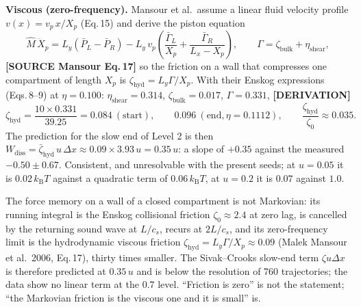 \documentclass[11pt,a4paper]{article}
\newcommand{\kT}{k_{\mathrm B}T}
\newcommand{\src}[1]{\textcolor{OliveGreen}{\textbf{[SOURCE #1]}}}
\newcommand{\der}{\textcolor{NavyBlue}{\textbf{[DERIVATION]}}}
\begin{document}
\textbf{Viscous (zero-frequency).} Mansour et al.\ assume a linear fluid velocity profile $v(x) = v_p\,x/X_p$ (Eq.\,15) and derive the piston equation
\begin{equation}
\hat M\,\ddot X_p = L_y(\bar P_L - \bar P_R) - L_y\,v_p\!\left(\frac{\bar\Gamma_L}{X_p} + \frac{\bar\Gamma_R}{L_x - X_p}\right),
\qquad \Gamma = \zeta_{\mathrm{bulk}} + \eta_{\mathrm{shear}},
\end{equation}
\src{Mansour Eq.\,17}
so the friction on a wall that compresses one compartment of length $X_p$ is $\zeta_{\mathrm{hyd}} = L_y\Gamma/X_p$. With their Enskog expressions (Eqs.\,8--9) at $\eta = 0.100$: $\eta_{\mathrm{shear}} = 0.314$, $\zeta_{\mathrm{bulk}} = 0.017$, $\Gamma = 0.331$, \der{}
\begin{equation}
\zeta_{\mathrm{hyd}} = \frac{10\times0.331}{39.25} = 0.084 \ (\text{start}),\qquad 0.096\ (\text{end}, \eta = 0.1112),
\qquad
\frac{\zeta_{\mathrm{hyd}}}{\zeta_0} \approx 0.035 .
\end{equation}
The prediction for the slow end of Level 2 is then $W_{\mathrm{diss}} = \bar\zeta_{\mathrm{hyd}}\,u\,\Delta x \approx 0.09\times3.93\,u = 0.35\,u$: a slope of $+0.35$ against the measured $-0.50 \pm 0.67$. Consistent, and unresolvable with the present seeds; at $u = 0.05$ it is $0.02\,\kT$ against a quadratic term of $0.06\,\kT$, at $u = 0.2$ it is $0.07$ against $1.0$.

\begin{answer}
The force memory on a wall of a closed compartment is not Markovian: its running integral is the Enskog collisional friction $\zeta_0 \approx 2.4$ at zero lag, is cancelled by the returning sound wave at $L/c_s$, recurs at $2L/c_s$, and its zero-frequency limit is the hydrodynamic viscous friction $\zeta_{\mathrm{hyd}} = L_y\Gamma/X_p \approx 0.09$ (Malek Mansour et al.\ 2006, Eq.\,17), thirty times smaller. The Sivak--Crooks slow-end term $\zeta u\Delta x$ is therefore predicted at $0.35\,u$ and is below the resolution of 760 trajectories; the data show no linear term at the $0.7$ level. ``Friction is zero'' is not the statement; ``the Markovian friction is the viscous one and it is small'' is.
\end{answer}
\end{document}
